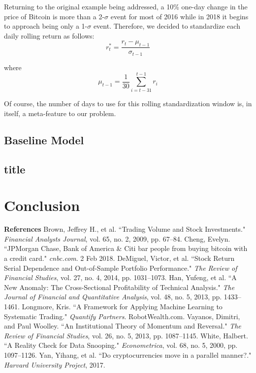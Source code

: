 \documentclass[12pt,twoside]{article}
\begin{document}
Returning to the original example being addressed, a 10\% one-day change in the price of Bitcoin is more than a 2-$\sigma$ event for most of 2016 while in 2018 it begins to approach being only a 1-$\sigma$ event. Therefore, we decided to standardize each daily rolling return as follows:
$$r^*_t = \frac{r_t - \mu_{t-1}}{\sigma_{t-1}}$$

where 
$$\mu_{t-1}=\frac{1}{30} \sum_{i=t-31}^{t-1} r_i$$

Of course, the number of days to use for this rolling standardization window is, in itself, a meta-feature to our problem.

\subsection{Baseline Model}



\subsection{title}



\section{Conclusion}



\newpage
{\large \textbf{References}}
\bigbreak
Brown, Jeffrey H., et al. ``Trading Volume and Stock Investments." \textit{Financial Analysts Journal}, vol. 65, no. 2, 2009, pp. 67–84.
\bigbreak
Cheng, Evelyn. ``JPMorgan Chase, Bank of America \& Citi bar people from buying bitcoin with a credit card." \textit{cnbc.com}. 2 Feb 2018.
\bigbreak
DeMiguel, Victor, et al. ``Stock Return Serial Dependence and Out-of-Sample Portfolio Performance." \textit{The Review of Financial Studies}, vol. 27, no. 4, 2014, pp. 1031–1073.
\bigbreak
Han, Yufeng, et al. ``A New Anomaly: The Cross-Sectional Profitability of Technical Analysis." \textit{The Journal of Financial and Quantitative Analysis}, vol. 48, no. 5, 2013, pp. 1433–1461.
\bigbreak
Longmore, Kris. ``A Framework for Applying Machine Learning to Systematic Trading." \textit{Quantify Partners}. RobotWealth.com.
\bigbreak
Vayanos, Dimitri, and Paul Woolley. ``An Institutional Theory of Momentum and Reversal." \textit{The Review of Financial Studies}, vol. 26, no. 5, 2013, pp. 1087–1145.
\bigbreak
White, Halbert. ``A Reality Check for Data Snooping." \textit{Econometrica}, vol. 68, no. 5, 2000, pp. 1097–1126.
\bigbreak
Yan, Yihang, et al. ``Do cryptocurrencies move in a parallel manner?." \textit{Harvard University Project}, 2017.
\bigbreak
\end{document}
